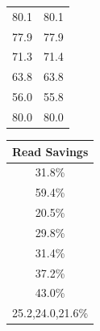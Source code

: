 \begin{table}
\begin{tabular}{|c|c|}
    80.1 & 80.1\\ 
    77.9 & 77.9 \\ 
    71.3 & 71.4 \\ 
    63.8 & 63.8 \\ 
    56.0 & {\color{red}55.8} \\
    80.0 & 80.0 \\ 
    \end{tabular}
    \begin{tabular}{|c}
    \\
    Read Savings \\
    \hline
    31.8\%\\ 
    59.4\%\\ 
    20.5\%\\ 
    29.8\%\\ 
    31.4\%\\ 
    37.2\%\\ 
    43.0\% \\
    25.2,24.0,21.6\%\\ 
    \end{tabular}
    

\end{table}
